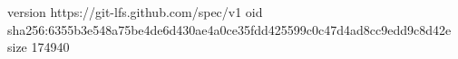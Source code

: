 version https://git-lfs.github.com/spec/v1
oid sha256:6355b3e548a75be4de6d430ae4a0ce35fdd425599c0c47d4ad8cc9edd9c8d42e
size 174940
